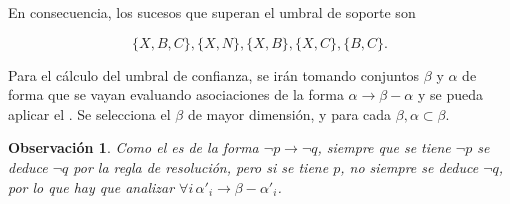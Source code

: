 \documentclass[12pt]{report}\usepackage[]{graphicx}\usepackage[dvipsnames]{xcolor}
\newtheorem{observation}{Observación}[section]
\begin{document}
			En consecuencia, los sucesos que superan el umbral de soporte son 
			
			$$
			\{X, B, C\}, \{X, N\}, \{X, B\}, \{X, C\}, \{B, C\}. 
			$$
			
			Para el cálculo del umbral de confianza, se irán tomando conjuntos $\beta$ y $\alpha$ de forma que se vayan evaluando asociaciones de la forma $\alpha \rightarrow \beta - \alpha$ y se pueda aplicar el . Se selecciona el $\beta$ de mayor dimensión, y para cada $\beta, \alpha \subset \beta$. 
			
			\begin{observation}
				Como el  es de la forma $\lnot p \rightarrow \lnot q$, siempre que se tiene $\lnot p$ se deduce $\lnot q$ por la regla de resolución, pero si se tiene $p$, no siempre se deduce $\lnot q$, por lo que hay que analizar $\forall i \, \alpha'_i \rightarrow \beta - \alpha'_i$.
				\label{obs:ap}
			\end{observation}
			
\end{document}
